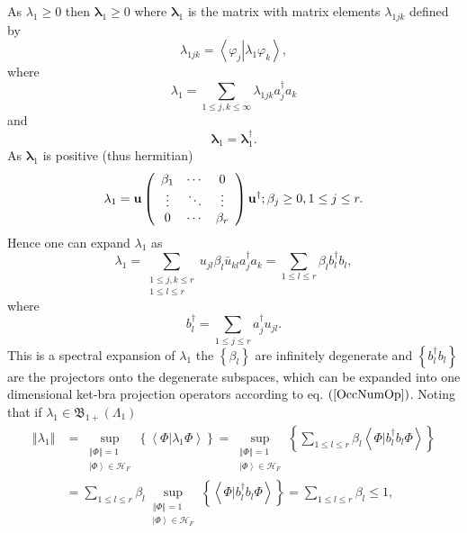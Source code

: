 \documentclass[aps,preprint]{revtex4}%
\begin{document}
As $\lambda_{1}\geq0$ then $\mathbf{\lambda}_{1}\geq0$ where $\mathbf{\lambda
}_{1}$ is the matrix with matrix elements $\lambda_{1jk}$ defined by
\begin{equation}
\lambda_{1jk}=\left\langle \left.  \varphi_{j}\right\vert \lambda_{1}%
\varphi_{k}\right\rangle ,
\end{equation}
where
\begin{equation}
\lambda_{1}=\sum_{1\leq j,k\leq\infty}\lambda_{1jk}a_{j}^{\dagger}a_{k}%
\end{equation}
and
\begin{equation}
\mathbf{\lambda}_{1}=\mathbf{\lambda}_{1}^{\dagger}.
\end{equation}
As $\mathbf{\lambda}_{1}$ is positive (thus hermitian)
\begin{equation}
\mathbf{\lambda}_{1}=\mathbf{u}\left(
\begin{array}
[c]{ccc}%
\beta_{1} & \cdots & 0\\
\vdots & \ddots & \vdots\\
0 & \cdots & \beta_{r}%
\end{array}
\right)  \mathbf{u}^{\dagger};\beta_{j}\geq0,1\leq j\leq r.
\end{equation}
Hence one can expand $\lambda_{1}$ as
\begin{equation}
\lambda_{1}=\sum_{\substack{1\leq j,k\leq r\\1\leq l\leq r}}u_{jl}\beta
_{l}\bar{u}_{kl}a_{j}^{\dagger}a_{k}=\sum_{1\leq l\leq r}\beta_{l}%
b_{l}^{\dagger}b_{l},
\end{equation}
where%
\begin{equation}
b_{l}^{\dagger}=\sum_{1\leq j\leq r}a_{j}^{\dagger}u_{jl}.
\end{equation}
This is a spectral expansion of $\lambda_{1}$ the $\left\{  \beta_{l}\right\}
$ are infinitely degenerate and $\left\{  b_{l}^{\dagger}b_{l}\right\}  $ are
the projectors onto the degenerate subspaces, which can be expanded into one
dimensional ket-bra projection operators according to eq. $\left(
\ref{OccNumOp}\right)  $. Noting that if $\lambda_{1}\in\mathfrak{B}%
_{1+}\left(  \Lambda_{1}\right)  $
\begin{align}
\left\Vert \lambda_{1}\right\Vert  &  =\sup_{\substack{\left\Vert
\Phi\right\Vert =1\\\left\vert \Phi\right\rangle \in\mathcal{H}_{F}}}\left\{
\left\langle \left.  \Phi\right\vert \lambda_{1}\Phi\right\rangle \right\}
=\sup_{\substack{\left\Vert \Phi\right\Vert =1\\\left\vert \Phi\right\rangle
\in\mathcal{H}_{F}}}\left\{  \sum_{1\leq l\leq r}\beta_{l}\left\langle \left.
\Phi\right\vert b_{l}^{\dagger}b_{l}\Phi\right\rangle \right\} \\
&  =\sum_{1\leq l\leq r}\beta_{l}\sup_{\substack{\left\Vert \Phi\right\Vert
=1\\\left\vert \Phi\right\rangle \in\mathcal{H}_{F}}}\left\{  \left\langle
\left.  \Phi\right\vert b_{l}^{\dagger}b_{l}\Phi\right\rangle \right\}
=\sum_{1\leq l\leq r}\beta_{l}\leq1,
\end{align}
\end{document}
